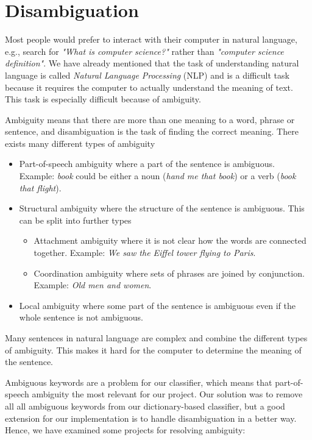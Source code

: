 \section{Disambiguation}
\label{sec:disambiguation}

Most people would prefer to interact with their computer in natural language, e.g., search for \emph{"What is computer science?"} rather than \emph{"computer science definition"}. We have already mentioned that the task of understanding natural language is called \emph{Natural Language Processing} (NLP) and is a difficult task because it requires the computer to actually understand the meaning of text. This task is especially difficult because of ambiguity. 

Ambiguity means that there are more than one meaning to a word, phrase or sentence, and disambiguation is the task of finding the correct meaning. There exists many different types of ambiguity \cite[][p.100 and p.466-468]{jurafsky2000speech}%
\begin{itemize}
\item Part-of-speech ambiguity where a part of the sentence is ambiguous. Example: \emph{book} could be either a noun (\emph{hand me that \emph{book}}) or a verb (\emph{\emph{book} that flight}).
\item Structural ambiguity where the structure of the sentence is ambiguous. This can be split into further types
\begin{itemize}
\item Attachment ambiguity where it is not clear how the words are connected together. Example: \emph{We saw the Eiffel tower flying to Paris}.
\item Coordination ambiguity where sets of phrases are joined by conjunction. Example: \emph{Old men and women}.
\end{itemize}
\item Local ambiguity where some part of the sentence is ambiguous even if the whole sentence is not ambiguous. 


\end{itemize}
Many sentences in natural language are complex and combine the different types of ambiguity. This makes it hard for the computer to determine the meaning of the sentence. 


Ambiguous keywords are a problem for our classifier, which means that part-of-speech ambiguity the most relevant for our project. Our solution was to remove all all ambiguous keywords from our dictionary-based classifier, but a good extension for our implementation is to handle disambiguation in a better way. Hence, we have examined some projects for resolving ambiguity:

